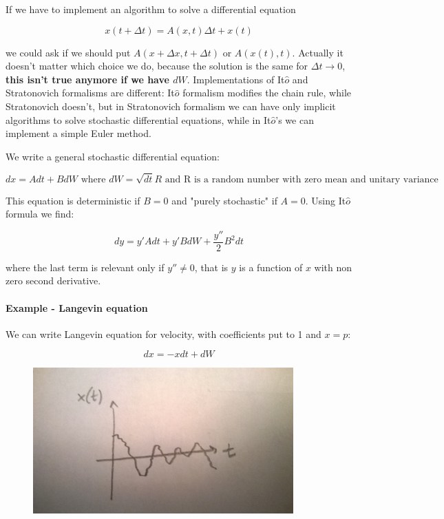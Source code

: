 \documentclass[a4paper, italian, openany]{book}
\begin{document}
\medskip

If we have to implement an algorithm to solve a differential equation

$$x(t + \Delta t) = A(x, t) \Delta t + x(t)$$

we could ask if we should put $A(x+\Delta x, t+\Delta t)$ or $A(x(t), t)$. Actually it doesn't matter which choice we do, because the solution is the same for $\Delta t \to 0$, \textbf{this isn't true anymore if we have $dW$}.\newline
Implementations of It$\hat{o}$ and Stratonovich formalisms are different: It$\hat{o}$ formalism modifies the chain rule, while Stratonovich doesn't, but in Stratonovich formalism we can have only implicit algorithms to solve stochastic differential equations, while in It$\hat{o}$'s we can implement a simple Euler method.

\medskip

We write a general stochastic differential equation:

$$dx = A dt + B dW \mbox{ where } dW= \sqrt{dt}R \mbox{ and R is a random number with zero mean and unitary variance}$$

This equation is deterministic if $B=0$ and "purely stochastic" if $A=0$. Using It$\hat{o}$ formula we find:

$$dy = y' A dt + y' B dW + \frac{y''}{2} B^2 dt$$

where the last term is relevant only if $y'' \ne 0$, that is $y$ is a function of $x$ with non zero second derivative.

\paragraph{Example - Langevin equation}

We can write Langevin equation for velocity, with coefficients put to 1 and $x=p$:

$$dx = -x dt + dW$$

\begin{figure}[H]
\centering
\includegraphics[width=100mm]{img/pic23.jpg}
\end{figure}
\end{document}
